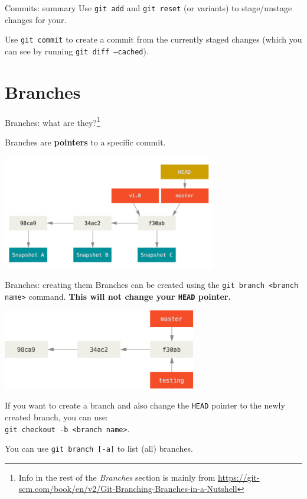 \documentclass{beeper}
\begin{document}
\begin{frame}{Commits: summary}
    Use \texttt{git add} and \texttt{git reset} (or variants) to stage/unstage
    changes for your.
    \pause

    Use \texttt{git commit} to create a commit from the currently staged changes
    (which you can see by running \texttt{git diff --cached}).
\end{frame}

\section{Branches}

\begin{frame}{Branches: what are they?\footnote[frame]{Info in the rest of the
    \textit{Branches} section is mainly from
    \url{https://git-scm.com/book/en/v2/Git-Branching-Branches-in-a-Nutshell}}}

    Branches are \textbf{pointers} to a specific commit.

    \begin{center}
        \includegraphics[height=50mm]{graphics/branching1}
    \end{center}
\end{frame}

\begin{frame}{Branches: creating them}
    Branches can be created using the \texttt{git branch <branch name>} command.
    \textbf{This will not change your \texttt{HEAD} pointer.}

    \begin{center}
        \includegraphics[height=35mm]{graphics/branching-creating}
    \end{center}

    If you want to create a branch and also change the \texttt{HEAD} pointer to
    the newly created branch, you can use:\\
    \texttt{git checkout -b <branch name>}.
    \pause

    You can use \texttt{git branch [-a]} to list (all) branches.
\end{frame}
\end{document}
